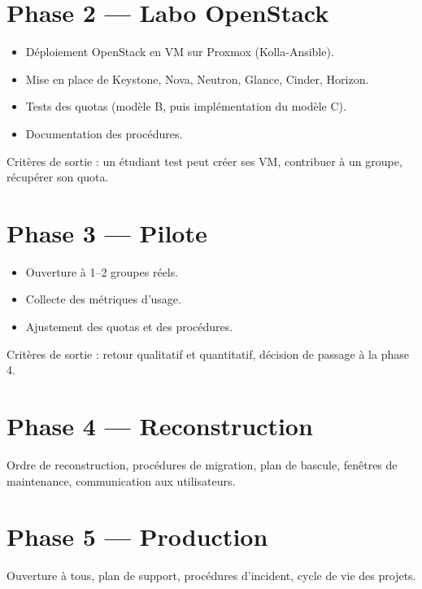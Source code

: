 \section{Phase 2 — Labo OpenStack}
\begin{itemize}
  \item Déploiement OpenStack en VM sur Proxmox (Kolla-Ansible).
  \item Mise en place de Keystone, Nova, Neutron, Glance, Cinder, Horizon.
  \item Tests des quotas (modèle B, puis implémentation du modèle C).
  \item Documentation des procédures.
\end{itemize}
Critères de sortie : un étudiant test peut créer ses VM, contribuer à un groupe, récupérer son quota.

\section{Phase 3 — Pilote}
\begin{itemize}
  \item Ouverture à 1–2 groupes réels.
  \item Collecte des métriques d'usage.
  \item Ajustement des quotas et des procédures.
\end{itemize}
Critères de sortie : retour qualitatif et quantitatif, décision de passage à la phase 4.

\section{Phase 4 — Reconstruction}
\begin{todobox}
Ordre de reconstruction, procédures de migration, plan de bascule, fenêtres de maintenance, communication aux utilisateurs.
\end{todobox}

\section{Phase 5 — Production}
\begin{todobox}
Ouverture à tous, plan de support, procédures d'incident, cycle de vie des projets.
\end{todobox}